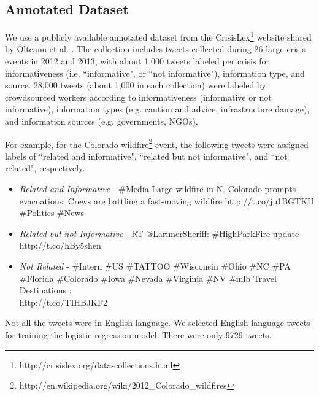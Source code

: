 \subsection{Annotated Dataset}
We use a publicly available annotated dataset from the CrisisLex\footnote{http://crisislex.org/data-collections.html} website shared by Olteanu et al. \cite{olteanu2014crisislex}. The collection includes tweets collected during 26 large crisis events in 2012 and 2013, with about 1,000 tweets labeled per crisis for informativeness (i.e. ``informative", or ``not informative"), information type, and source. 28,000 tweets (about 1,000 in each collection) were labeled by crowdsourced workers according to informativeness (informative or not informative), information types (e.g. caution and advice, infrastructure damage), and information sources (e.g. governments, NGOs).

For example, for the Colorado wildfire\footnote{http://en.wikipedia.org/wiki/2012\_Colorado\_wildfires} event, the following tweets were assigned labels of ``related and informative", ``related but not informative", and ``not related", respectively.

\begin{itemize}
\item \textit{Related and Informative} - \#Media Large wildfire in N. Colorado prompts evacuations: Crews are battling a fast-moving wildfire http://t.co/ju1BGTKH \#Politics \#News

\item \textit{Related but not Informative} - RT @LarimerSheriff: \#HighParkFire update \\ http://t.co/hBy5shen

\item \textit{Not Related} - \#Intern \#US \#TATTOO \#Wisconsin \#Ohio \#NC \#PA \#Florida \#Colorado \#Iowa \#Nevada \#Virginia \#NV \#mlb Travel Destinations ; \\ http://t.co/TIHBJKF2
\end{itemize}

Not all the tweets were in English language. We selected English language tweets for training the logistic regression model. There were only 9729 tweets. 

